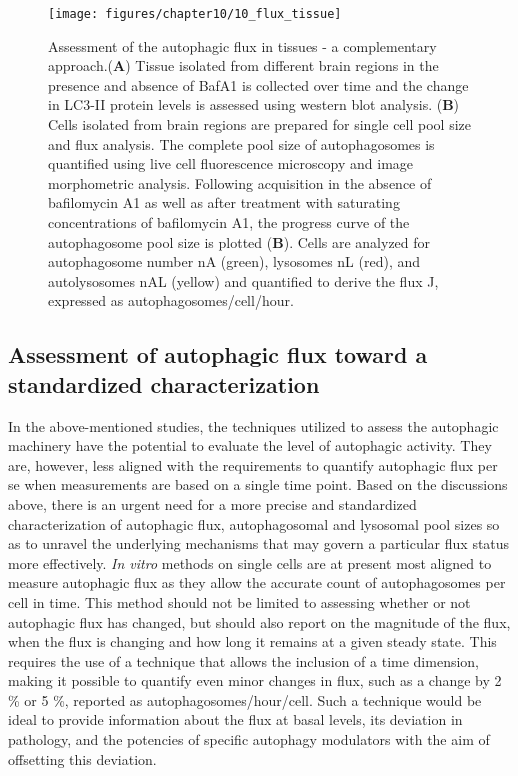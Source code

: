 \begin{figure}[!htbp]
  \texttt{[image: figures/chapter10/10\_flux\_tissue]}
  \caption[Assessment of the autophagic flux in tissues.]{Assessment of the autophagic flux in tissues - a complementary approach.(\textbf{A}) Tissue isolated from different brain regions in the presence and absence of BafA1 is collected over time and the change in LC3-II protein levels is assessed using western blot analysis. (\textbf{B}) Cells isolated from brain regions are prepared for single cell pool size and flux analysis. The complete pool size of autophagosomes is quantified using live cell fluorescence microscopy and image morphometric analysis. Following acquisition in the absence of bafilomycin A1 as well as after treatment with saturating concentrations of bafilomycin A1, the progress curve of the autophagosome pool size is plotted (\textbf{B}). Cells are analyzed for autophagosome number nA (green), lysosomes nL (red), and autolysosomes nAL (yellow) and quantified to derive the flux J, expressed as autophagosomes/cell/hour.}
  \label{fig:10_flux_tissue}
\end{figure}

\subsection{Assessment of autophagic flux  toward a standardized characterization}
In the above-mentioned studies, the techniques utilized to assess the autophagic machinery have the potential to evaluate the level of autophagic activity. They are, however, less aligned with the requirements to quantify autophagic flux per se when measurements are based on a single time point. Based on the discussions above, there is an urgent need for a more precise and standardized characterization of autophagic flux, autophagosomal and lysosomal pool sizes so as to unravel the underlying mechanisms that may govern a particular flux status more effectively. \textit{In vitro} methods on single cells are at present most aligned to measure autophagic flux as they allow the accurate count of autophagosomes per cell in time. This method should not be limited to assessing whether or not autophagic flux has changed, but should also report on the magnitude of the flux, when the flux is changing and how long it remains at a given steady state. This requires the use of a technique that allows the inclusion of a time dimension, making it possible to quantify even minor changes in flux, such as a change by 2 \% or 5 \%, reported as autophagosomes/hour/cell. Such a technique would be ideal to provide information about the flux at basal levels, its deviation in pathology, and the potencies of specific autophagy modulators with the aim of offsetting this deviation. 

